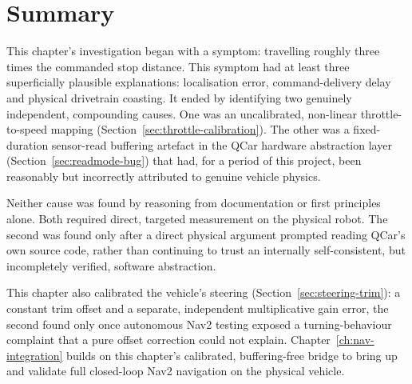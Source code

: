 \section{Summary}
\label{sec:calibration-summary}

This chapter's investigation began with a symptom: travelling
roughly three times the commanded stop distance. This symptom had at
least three superficially plausible explanations: localisation error,
command-delivery delay and physical drivetrain coasting. It ended
by identifying two genuinely independent, compounding causes. One
was an uncalibrated, non-linear throttle-to-speed mapping
(Section~\ref{sec:throttle-calibration}). The other was a
fixed-duration sensor-read buffering artefact in the QCar hardware
abstraction layer (Section~\ref{sec:readmode-bug}) that had, for a
period of this project, been reasonably but incorrectly attributed
to genuine vehicle physics.

Neither cause was found by reasoning from documentation or first
principles alone. Both required direct, targeted measurement on the
physical robot. The second was found only after a direct
physical argument prompted reading QCar's
own source code, rather than continuing to trust an internally
self-consistent, but incompletely verified, software abstraction.

This chapter also calibrated the vehicle's steering
(Section~\ref{sec:steering-trim}): a constant trim offset and a
separate, independent multiplicative gain error, the second found
only once autonomous Nav2 testing exposed a turning-behaviour
complaint that a pure offset correction could not explain.
Chapter~\ref{ch:nav-integration} builds on this
chapter's calibrated, buffering-free bridge to bring up and validate
full closed-loop Nav2 navigation on the physical vehicle.

